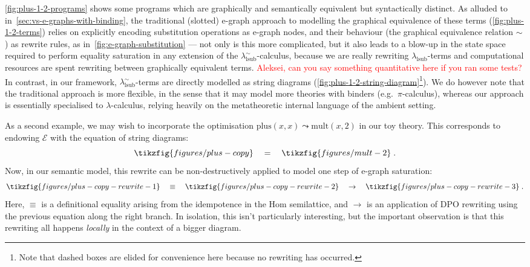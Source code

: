 \autoref{fig:plus-1-2-programs} shows some programs which are graphically and semantically equivalent but syntactically distinct.
As alluded to in~\autoref{sec:vs-e-graphs-with-binding}, the traditional (slotted) e-graph approach to modelling the graphical equivalence of these terms (\autoref{fig:plus-1-2-terms}) relies on explicitly encoding substitution operations as e-graph nodes, and their behaviour (the graphical equivalence relation $\sim$) as rewrite rules, as in~\autoref{fig:e-graph-substitution} --- not only is this more complicated, but it also leads to a blow-up in the state space required to perform equality saturation in any extension of the $\lambda^\sim_{\text{lsub}}$-calculus, because we are really rewriting $\lambda_{\text{lsub}}$-terms and computational resources are spent rewriting between graphically equivalent terms.
\textcolor{red}{Aleksei, can you say something quantitative here if you ran some tests?}
In contrast, in our framework, $\lambda^\sim_{\text{lsub}}$-terms are directly modelled as string diagrams (\autoref{fig:plus-1-2-string-diagram}\footnote{Note that dashed boxes are elided for convenience here because no rewriting has occurred.}).
We do however note that the traditional approach is more flexible, in the sense that it may model more theories with binders (e.g.\ $\pi$-calculus), whereas our approach is essentially specialised to $\lambda$-calculus, relying heavily on the metatheoretic internal language of the ambient setting.

As a second example, we may wish to incorporate the optimisation ${\text{plus} (x, x) \leadsto \text{mult} (x, 2)}$ in our toy theory.
This corresponds to endowing $\mathcal{E}$ with the equation of string diagrams:
\[
	\tikzfig{figures/plus-copy}
	\quad
	=
	\quad
	\tikzfig{figures/mult-2}
	\;
	.
\]
Now, in our semantic model, this rewrite can be non-destructively applied to model one step of e-graph saturation:
\[
	\tikzfig{figures/plus-copy-rewrite-1}
	\quad
	\equiv
	\quad
	\tikzfig{figures/plus-copy-rewrite-2}
	\quad
	\to
	\quad
	\tikzfig{figures/plus-copy-rewrite-3}
	\;
	.
\]
Here, $\equiv$ is a definitional equality arising from the idempotence in the Hom semilattice, and $\to$ is an application of DPO rewriting using the previous equation along the right branch.
In isolation, this isn't particularly interesting, but the important observation is that this rewriting all happens \emph{locally} in the context of a bigger diagram.

